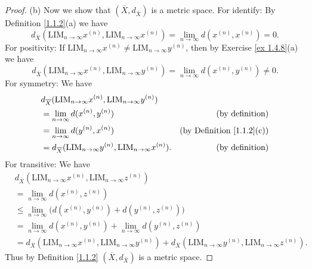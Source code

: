 \begin{proof}{(b)}
    Now we show that \((\overline{X}, d_{\overline{X}})\) is a metric space.
    For identify:
    By Definition \ref{1.1.2}(a) we have
    \[
        d_{\overline{X}}(\text{LIM}_{n \to \infty} x^{(n)}, \text{LIM}_{n \to \infty} x^{(n)}) = \lim_{n \to \infty} d(x^{(n)}, x^{(n)}) = 0.
    \]
    For positivity:
    If \(\text{LIM}_{n \to \infty} x^{(n)} \neq \text{LIM}_{n \to \infty} y^{(n)}\), then by Exercise \ref{ex 1.4.8}(a) we have
    \[
        d_{\overline{X}}(\text{LIM}_{n \to \infty} x^{(n)}, \text{LIM}_{n \to \infty} y^{(n)}) = \lim_{n \to \infty} d(x^{(n)}, y^{(n)}) \neq 0.
    \]
    For symmetry:
    We have
    \begin{align*}
         & d_{\overline{X}}(\text{LIM}_{n \to \infty} x^{(n)}, \text{LIM}_{n \to \infty} y^{(n)})                                            \\
         & = \lim_{n \to \infty} d(x^{(n)}, y^{(n)})                                                 & \text{(by definition)}                \\
         & = \lim_{n \to \infty} d(y^{(n)}, x^{(n)})                                                 & \text{(by Definition \ref{1.1.2}(c))} \\
         & = d_{\overline{X}}(\text{LIM}_{n \to \infty} y^{(n)}, \text{LIM}_{n \to \infty} x^{(n)}). & \text{(by definition)}
    \end{align*}
    For transitive:
    We have
    \begin{align*}
         & d_{\overline{X}}(\text{LIM}_{n \to \infty} x^{(n)}, \text{LIM}_{n \to \infty} z^{(n)})                                                                                             \\
         & = \lim_{n \to \infty} d(x^{(n)}, z^{(n)})                                                                                                                                          \\
         & \leq \lim_{n \to \infty} \big(d(x^{(n)}, y^{(n)}) + d(y^{(n)}, z^{(n)})\big)                                                                                                       \\
         & = \lim_{n \to \infty} d(x^{(n)}, y^{(n)}) + \lim_{n \to \infty} d(y^{(n)}, z^{(n)})                                                                                                \\
         & = d_{\overline{X}}(\text{LIM}_{n \to \infty} x^{(n)}, \text{LIM}_{n \to \infty} y^{(n)}) + d_{\overline{X}}(\text{LIM}_{n \to \infty} y^{(n)}, \text{LIM}_{n \to \infty} z^{(n)}).
    \end{align*}
    Thus by Definition \ref{1.1.2} \((\overline{X}, d_{\overline{X}})\) is a metric space.
\end{proof}

